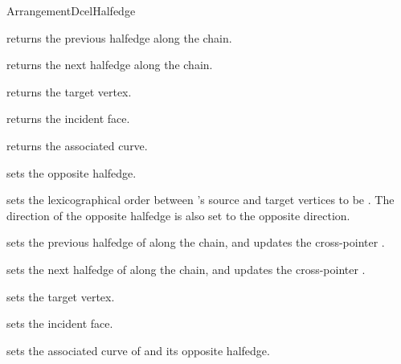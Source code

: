 \begin{ccRefConcept}{ArrangementDcelHalfedge}
{  
    {returns the previous halfedge along the chain.}

    {returns the next halfedge along the chain.}

    {returns the target vertex.}

    {returns the incident face.}

    {returns the associated curve.}

\ccModifiers

    {sets the opposite halfedge.}

    {sets the lexicographical order between \ccVar{}'s source and target
     vertices to be . The direction of the opposite halfedge is
     also set to the opposite direction.
     }

    {sets the previous halfedge of \ccVar{} along the chain,
     and updates the cross-pointer .}

    {sets the next halfedge of \ccVar{} along the chain,
     and updates the cross-pointer .}

    {sets the target vertex.}

    {sets the incident face.}

    {sets the associated curve of \ccVar{} and its opposite halfedge.}

} %

\ccSeeAlso

     \\
     \\

\end{ccRefConcept}  

\ccRefPageEnd
